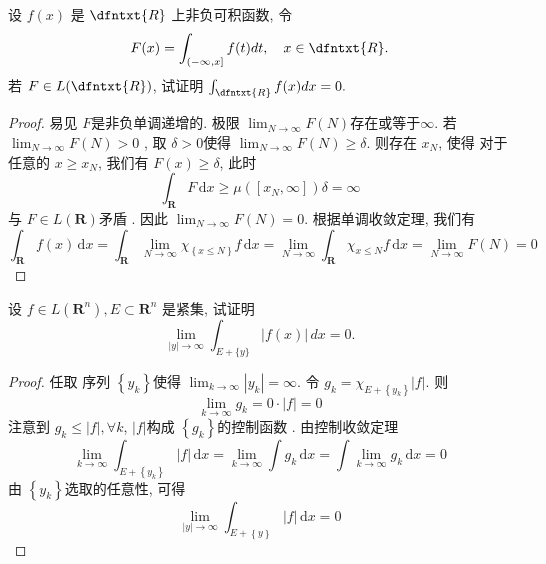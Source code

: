 \documentclass[../main.tex]{subfiles}
\begin{document}
\begin{exercise}{}{}
设 $f(x)$ 是 $\dfntxt{R}$ 上非负可积函数, 令
\[
F(x) = \int_{(-\infty, x]} f(t) dt, \quad x \in \dfntxt{R}.
\]
若 $F \in L(\dfntxt{R})$, 试证明 $\int_{\dfntxt{R}} f(x) dx = 0.$
\end{exercise}
\begin{proof}
 易见 \(  F  \)是非负单调递增的. 极限 \(  \lim_{N\to \infty}F\left( N \right)   \)存在或等于\(  \infty  \). 若 \(  \lim_{N\to \infty}F\left( N \right)> 0   \) , 取 \(   \delta > 0  \)使得 \(  \lim_{N\to \infty}F\left( N \right)\ge   \delta    \). 则存在 \(  x_{N}  \), 使得 对于任意的 \(  x\ge  x_{N} \), 我们有 \(  F\left( x \right)\ge   \delta    \), 此时 \[
 \int_{\mathbf{R}}F\,\mathrm{d} x\ge \mu \left( [x_{N},\infty] \right) \delta = \infty 
 \]与 \(  F  \in L\left( \mathbf{R} \right) \)矛盾 . 因此 \(  \lim_{N\to \infty}F\left( N \right)= 0   \).          根据单调收敛定理, 我们有 \[
 \int_{\mathbf{R}}f\left( x \right)\,\mathrm{d} x=\int_{\mathbf{R}}\lim_{N\to \infty}\chi _{\left\{ x\le N \right\}}f\,\mathrm{d} x = \lim_{N\to \infty}\int_{\mathbf{R}}\chi _{x\le N}f\,\mathrm{d} x= \lim_{N\to \infty}F\left( N \right)= 0 
 \]
\end{proof}

\begin{exercise}{}
设 $f \in L(\mathbf{R}^n), E \subset \mathbf{R}^n$ 是紧集, 试证明
\[
\lim_{|y| \to \infty} \int_{E+\{y\}} |f(x)| \, dx = 0.
\]
\end{exercise}

\begin{proof}
   任取 序列 \(  \left\{ y_{k} \right\}  \)使得 \(  \lim_{k\to \infty}\left| y_{k} \right|= \infty   \). 令 \(  g_{k}=  \chi _{E+ \left\{ y_{k} \right\}}\left| f \right|   \). 则 \[
   \lim_{k\to \infty}g_{k}= 0\cdot \left| f \right|= 0 
   \]  注意到 \(  g_{k}\le \left| f \right|   ,\forall k\),    \(  \left| f \right|   \)构成 \(  \left\{ g_{k} \right\}  \)的控制函数  . 由控制收敛定理 \[
   \lim_{k\to \infty}\int_{E+ \left\{ y_{k} \right\}}\left| f \right|\,\mathrm{d} x= \lim_{k\to \infty}\int g_{k}\,\mathrm{d} x= \int \lim_{k\to \infty}g_{k}\,\mathrm{d} x= 0 
   \]由 \(  \left\{ y_{k} \right\}  \)选取的任意性, 可得 \[
   \lim_{\left| y \right|\to \infty }\int_{E+ \left\{ y \right\}}\left| f \right|\,\mathrm{d} x= 0 
   \] 
\end{proof}
\end{document}
